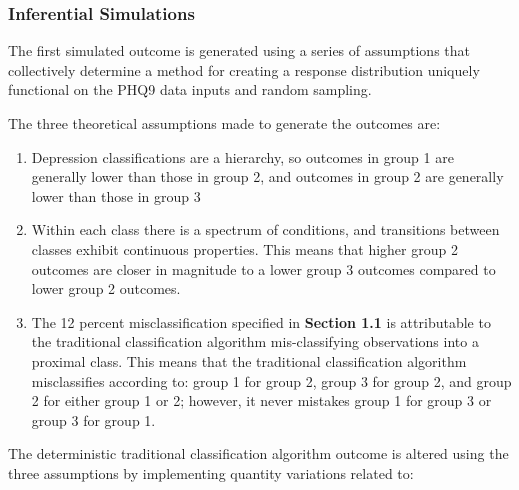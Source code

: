 \documentclass[12pt,]{article}
\providecommand{\tightlist}{%
  \setlength{\itemsep}{0pt}\setlength{\parskip}{0pt}}
\begin{document}
\hypertarget{inferential-simulations}{%
\subsubsection{Inferential Simulations}\label{inferential-simulations}}

The first simulated outcome is generated using a series of assumptions
that collectively determine a method for creating a response
distribution uniquely functional on the PHQ9 data inputs and random
sampling.

The three theoretical assumptions made to generate the outcomes are:

\begin{enumerate}
\def\labelenumi{\arabic{enumi}.}
\tightlist
\item
  Depression classifications are a hierarchy, so outcomes in group 1 are
  generally lower than those in group 2, and outcomes in group 2 are
  generally lower than those in group 3
\item
  Within each class there is a spectrum of conditions, and transitions
  between classes exhibit continuous properties. This means that higher
  group 2 outcomes are closer in magnitude to a lower group 3 outcomes
  compared to lower group 2 outcomes.
\item
  The 12 percent misclassification specified in \textbf{Section 1.1} is
  attributable to the traditional classification algorithm
  mis-classifying observations into a proximal class. This means that
  the traditional classification algorithm misclassifies according to:
  group 1 for group 2, group 3 for group 2, and group 2 for either group
  1 or 2; however, it never mistakes group 1 for group 3 or group 3 for
  group 1.
\end{enumerate}

The deterministic traditional classification algorithm outcome is
altered using the three assumptions by implementing quantity variations
related to:
\end{document}
